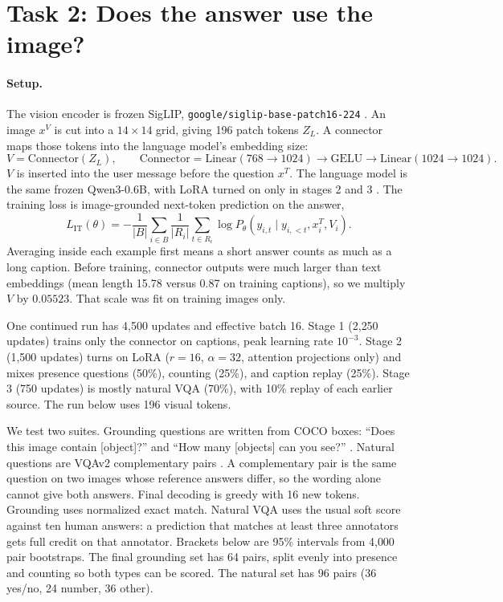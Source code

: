 \documentclass[10pt]{article}
\begin{document}
\section{Task 2: Does the answer use the image?}
\label{sec:vlm}

\paragraph{Setup.}
The vision encoder is frozen SigLIP, \texttt{google/siglip-base-patch16-224} \cite{zhai2023siglip}.
An image $x^{V}$ is cut into a $14\times14$ grid, giving 196 patch tokens $Z_L$.
A connector maps those tokens into the language model's embedding size:
\[
V=\mathrm{Connector}(Z_L),\qquad
\mathrm{Connector}=\mathrm{Linear}(768\!\to\!1024)\to\mathrm{GELU}\to\mathrm{Linear}(1024\!\to\!1024).
\]
$V$ is inserted into the user message before the question $x^{T}$.
The language model is the same frozen Qwen3-0.6B, with LoRA turned on only in stages 2 and 3 \cite{liu2023llava,qwen3}.
The training loss is image-grounded next-token prediction on the answer,
\begin{equation}
L_{\mathrm{IT}}(\theta)
=-\frac1{|B|}\sum_{i\in B}\frac1{|R_i|}
\sum_{t\in R_i}\log P_{\theta}(y_{i,t}\mid y_{i,<t},x_i^{T},V_i).
\label{eq:lit}
\end{equation}
Averaging inside each example first means a short answer counts as much as a long caption.
Before training, connector outputs were much larger than text embeddings (mean length 15.78 versus 0.87 on training captions), so we multiply $V$ by $0.05523$.
That scale was fit on training images only.

One continued run has 4{,}500 updates and effective batch 16.
Stage 1 (2{,}250 updates) trains only the connector on captions, peak learning rate $10^{-3}$.
Stage 2 (1{,}500 updates) turns on LoRA ($r=16$, $\alpha=32$, attention projections only) and mixes presence questions (50\%), counting (25\%), and caption replay (25\%).
Stage 3 (750 updates) is mostly natural VQA (70\%), with 10\% replay of each earlier source.
The run below uses 196 visual tokens.

We test two suites.
Grounding questions are written from COCO boxes: ``Does this image contain [object]?'' and ``How many [objects] can you see?'' \cite{lin2014coco}.
Natural questions are VQAv2 complementary pairs \cite{goyal2017vqa}.
A complementary pair is the same question on two images whose reference answers differ, so the wording alone cannot give both answers.
Final decoding is greedy with 16 new tokens.
Grounding uses normalized exact match.
Natural VQA uses the usual soft score against ten human answers: a prediction that matches at least three annotators gets full credit on that annotator.
Brackets below are 95\% intervals from 4{,}000 pair bootstraps.
The final grounding set has 64 pairs, split evenly into presence and counting so both types can be scored.
The natural set has 96 pairs (36 yes/no, 24 number, 36 other).
\end{document}

